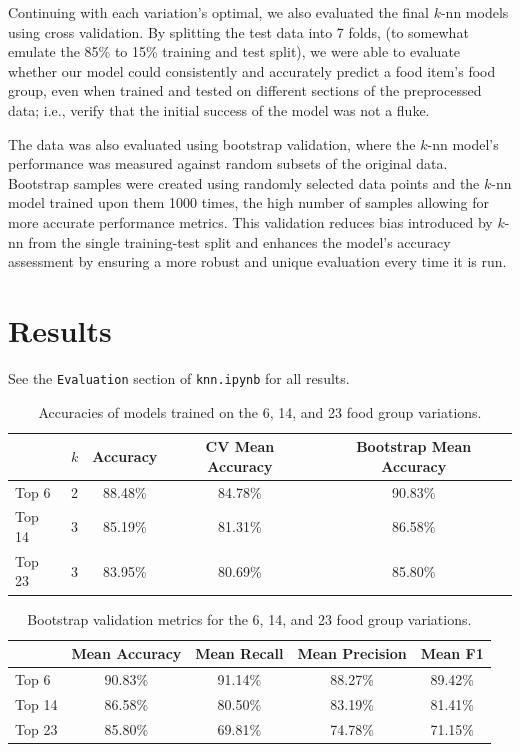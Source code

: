 \documentclass[11pt]{article}
\begin{document}
Continuing with each variation's optimal, we also evaluated the final $k$-nn models using cross validation. By splitting the test data into 7 folds, (to somewhat emulate the 85\% to 15\% training and test split), we were able to evaluate whether our model could consistently and accurately predict a food item's food group, even when trained and tested on different sections of the preprocessed data; i.e., verify that the initial success of the model was not a fluke.

The data was also evaluated using bootstrap validation, where the $k$-nn model's performance was measured against random subsets of the original data. Bootstrap samples were created using randomly selected data points and the $k$-nn model trained upon them 1000 times, the high number of samples allowing for more accurate performance metrics. This validation reduces bias introduced by $k$-nn from the single training-test split and enhances the model's accuracy assessment by ensuring a more robust and unique evaluation every time it is run.

\section{Results}

See the \verb|Evaluation| section of \verb|knn.ipynb| for all results.

\begin{table}[h]
    \centering
    \begin{tabular}{|l|c|c|c|c|}
        \toprule
        & $k$ & Accuracy & CV Mean Accuracy & Bootstrap Mean Accuracy \\
        \hline
        Top 6     & 2 & 88.48\% & 84.78\% & 90.83\% \\
        Top 14    & 3 & 85.19\% & 81.31\% & 86.58\% \\
        Top 23    & 3 & 83.95\% & 80.69\% & 85.80\% \\
        \bottomrule
    \end{tabular}
    \vspace{0.4cm}
    \caption{Accuracies of models trained on the 6, 14, and 23 food group variations.}
    \label{tab:accuracy}
\end{table}

\begin{table}[h]
    \centering
    \begin{tabular}{|l|c|c|c|c|}
        \toprule
        & Mean Accuracy & Mean Recall & Mean Precision & Mean F1 \\
        \hline
        Top 6     & 90.83\% & 91.14\% & 88.27\% & 89.42\% \\
        Top 14    & 86.58\% & 80.50\% & 83.19\% & 81.41\% \\
        Top 23    & 85.80\% & 69.81\% & 74.78\% & 71.15\% \\
        \bottomrule
    \end{tabular}
    \vspace{0.4cm}
    \caption{Bootstrap validation metrics for the 6, 14, and 23 food group variations.}
    \label{tab:bootstrap}
\end{table}
\end{document}
